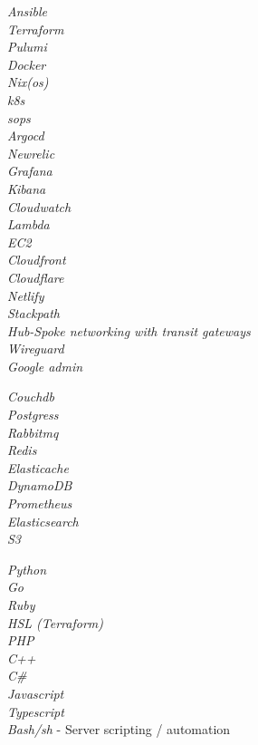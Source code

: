 \documentclass[10pt]{article} %
\begin{document}
{
\textit{Ansible}\\
\textit{Terraform}\\
\textit{Pulumi}\\
\textit{Docker}\\
\textit{Nix(os)}\\
\textit{k8s}\\
\textit{sops}\\
\textit{Argocd}\\
\textit{Newrelic}\\
\textit{Grafana}\\
\textit{Kibana}\\
\textit{Cloudwatch}\\
\textit{Lambda}\\
\textit{EC2}\\
\textit{Cloudfront}\\
\textit{Cloudflare}\\
\textit{Netlify}\\
\textit{Stackpath}\\
\textit{Hub-Spoke networking with transit gateways}\\
\textit{Wireguard}\\
\textit{Google admin}\\
}

 {
\textit{Couchdb}\\
\textit{Postgress}\\
\textit{Rabbitmq}\\
\textit{Redis}\\
\textit{Elasticache}\\
\textit{DynamoDB}\\
\textit{Prometheus}\\
\textit{Elasticsearch}\\
\textit{S3}\\
}

{
\textit{Python}\\
\textit{Go}\\
\textit{Ruby}\\
\textit{HSL (Terraform)}\\
\textit{PHP}\\
\textit{C++}\\
\textit{C\#}\\
\textit{Javascript}\\
\textit{Typescript}\\
\textit{Bash/sh} - Server scripting / automation
}
\end{document}
